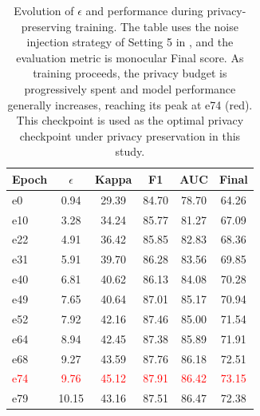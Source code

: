 \begin{table}[!htb]
\centering
\caption{Evolution of $\epsilon$ and performance during privacy-preserving training. The table uses the noise injection strategy of Setting 5 in , and the evaluation metric is monocular Final score. As training proceeds, the privacy budget is progressively spent and model performance generally increases, reaching its peak at e74 (red). This checkpoint is used as the optimal privacy checkpoint under privacy preservation in this study.}
\label{tab:privacy-evolution}
\begin{tabular}{lccccc}
\toprule
Epoch & $\epsilon$ & Kappa & F1 & AUC & Final \\
\midrule
e0 & 0.94 & 29.39 & 84.70 & 78.70 & 64.26 \\
e10 & 3.28 & 34.24 & 85.77 & 81.27 & 67.09 \\
e22 & 4.91 & 36.42 & 85.85 & 82.83 & 68.36 \\
e31 & 5.91 & 39.70 & 86.28 & 83.56 & 69.85 \\
e40 & 6.81 & 40.62 & 86.13 & 84.08 & 70.28 \\
e49 & 7.65 & 40.64 & 87.01 & 85.17 & 70.94 \\
e52 & 7.92 & 42.16 & 87.46 & 85.00 & 71.54 \\
e64 & 8.94 & 42.45 & 87.38 & 85.89 & 71.91 \\
e68 & 9.27 & 43.59 & 87.76 & 86.18 & 72.51 \\
\textcolor{red}{e74} & \textcolor{red}{9.76} & \textcolor{red}{45.12} & \textcolor{red}{87.91} & \textcolor{red}{86.42} & \textcolor{red}{73.15} \\
e79 & 10.15 & 43.16 & 87.51 & 86.47 & 72.38 \\
\bottomrule
\end{tabular}
\end{table}
